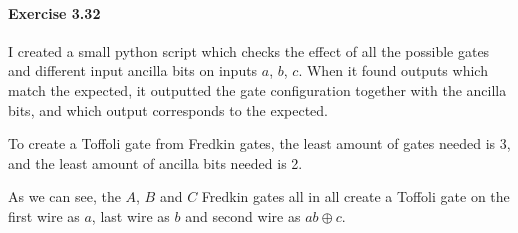 \documentclass[a4paper,12pt]{article}
\newcommand{\exercise}[1]{\paragraph{Exercise #1}}
\begin{document}
    \exercise{3.32} I created a small python script which checks the effect of all the possible gates and different input ancilla bits on inputs $a$, $b$, $c$. When it found outputs which match the expected, it outputted the gate configuration together with the ancilla bits, and which output corresponds to the expected.

    To create a Toffoli gate from Fredkin gates, the least amount of gates needed is 3, and the least amount of ancilla bits needed is 2.
    \begin{center}
    \end{center}
    As we can see, the $A$, $B$ and $C$ Fredkin gates all in all create a Toffoli gate on the first wire as $a$, last wire as $b$ and second wire as $ab \oplus c$.
\end{document}
